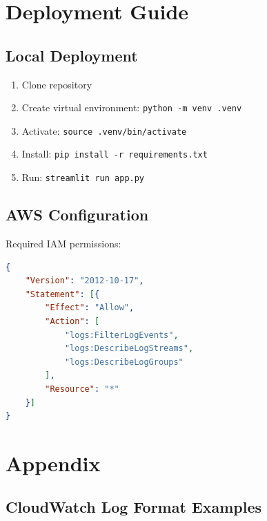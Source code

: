 \documentclass[12pt,a4paper]{article}
\begin{document}
\section{Deployment Guide}

\subsection{Local Deployment}

\begin{enumerate}
    \item Clone repository
    \item Create virtual environment: \texttt{python -m venv .venv}
    \item Activate: \texttt{source .venv/bin/activate}
    \item Install: \texttt{pip install -r requirements.txt}
    \item Run: \texttt{streamlit run app.py}
\end{enumerate}

\subsection{AWS Configuration}

Required IAM permissions:
\begin{lstlisting}[language=json, caption=IAM Policy]
{
    "Version": "2012-10-17",
    "Statement": [{
        "Effect": "Allow",
        "Action": [
            "logs:FilterLogEvents",
            "logs:DescribeLogStreams",
            "logs:DescribeLogGroups"
        ],
        "Resource": "*"
    }]
}
\end{lstlisting}

\pagebreak

\section{Appendix}

\subsection{CloudWatch Log Format Examples}
\end{document}
